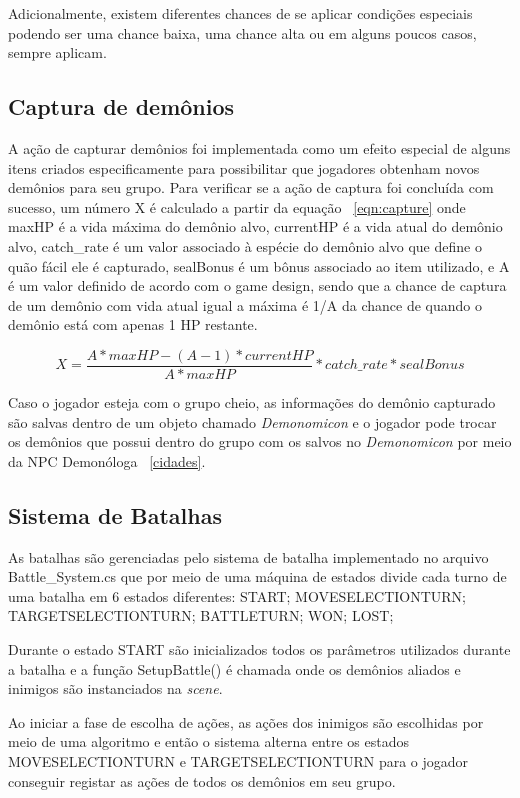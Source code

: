 \documentclass[
	12pt,				%
	openright,			%
	twoside,			%
	a4paper,			%
	english,			%
	french,				%
	spanish,			%
	brazil				%
	]{abntex2}
\begin{document}
	Adicionalmente, existem diferentes chances de se aplicar condições especiais podendo ser uma chance baixa, uma chance alta ou em alguns poucos casos, sempre aplicam.

\subsection{Captura de demônios}
	
	A ação de capturar demônios foi implementada como um efeito especial de alguns itens criados especificamente para possibilitar que jogadores obtenham novos demônios para seu grupo. Para verificar se a ação de captura foi concluída com sucesso, um número X é calculado a partir da equação ~\ref{eqn:capture} onde maxHP é a vida máxima do demônio alvo, currentHP é a vida atual do demônio alvo, catch\_rate é um valor associado à espécie do demônio alvo que define o quão fácil ele é capturado, sealBonus é um bônus associado ao item utilizado, e A é um valor definido de acordo com o game design, sendo que a chance de captura de um demônio com vida atual igual a máxima é 1/A da chance de quando o demônio está com apenas 1 HP restante.

\begin{equation}
\label{eqn:capture}
X = \frac{A * maxHP - (A-1)*currentHP}{A*maxHP}*catch\_rate*sealBonus
\end{equation}

	Caso o jogador esteja com o grupo cheio, as informações do demônio capturado são salvas dentro de um objeto chamado \emph{Demonomicon} e o jogador pode trocar os demônios que possui dentro do grupo com os salvos no \emph{Demonomicon} por meio da NPC Demonóloga ~\ref{cidades}.
	
\subsection{Sistema de Batalhas}

	As batalhas são gerenciadas pelo sistema de batalha implementado no arquivo Battle\_System.cs que por meio de uma máquina de estados divide cada turno de uma batalha em 6 estados diferentes: START; MOVESELECTIONTURN; TARGETSELECTIONTURN; BATTLETURN; WON; LOST;
	
	Durante o estado START são inicializados todos os parâmetros utilizados durante a batalha e a função SetupBattle() é chamada onde os demônios aliados e inimigos são instanciados na \emph{scene}.

	Ao iniciar a fase de escolha de ações, as ações dos inimigos são escolhidas por meio de uma algoritmo e então o sistema alterna entre os estados MOVESELECTIONTURN e TARGETSELECTIONTURN para o jogador conseguir registar as ações de todos os demônios em seu grupo.
\end{document}
